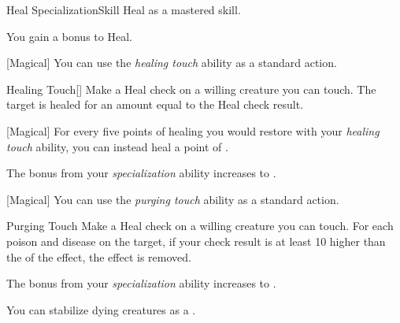     \begin{feat}{Heal Specialization}{Skill}
        \featpre Heal as a mastered skill.

         You gain a  bonus to Heal.

        [Magical] You can use the \textit{healing touch} ability as a standard action.
        \begin{freeability}{Healing Touch}[]
            Make a Heal check on a willing creature you can touch.
            The target is healed for an amount equal to the Heal check result.
        \end{freeability}

        [Magical] For every five points of healing you would restore with your \textit{healing touch} ability, you can instead heal a point of .

         The bonus from your \textit{specialization} ability increases to .

        [Magical] You can use the \textit{purging touch} ability as a standard action.
        \begin{freeability}{Purging Touch}
            Make a Heal check on a willing creature you can touch.
            For each poison and disease on the target, if your check result is at least 10 higher than the  of the effect, the effect is removed.
        \end{freeability}

         The bonus from your \textit{specialization} ability increases to .

         You can stabilize dying creatures as a .
    \end{feat}

